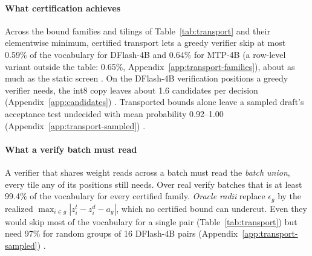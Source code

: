 \paragraph{What certification achieves} Across the bound families and tilings of Table~\ref{tab:transport} and their elementwise minimum, certified transport lets a greedy verifier skip at most 0.59\% of the vocabulary for DFlash-4B and 0.64\% for MTP-4B (a row-level variant outside the table: 0.65\%, Appendix~\ref{app:transport-families}), about as much as the static screen . On the DFlash-4B verification positions a greedy verifier needs, the int8 copy leaves about 1.6 candidates per decision (Appendix~\ref{app:candidates}) . Transported bounds alone leave a sampled draft's acceptance test undecided with mean probability 0.92--1.00 (Appendix~\ref{app:transport-sampled}) .

\paragraph{What a verify batch must read} A verifier that shares weight reads across a batch must read the \emph{batch union}, every tile any of its positions still needs. Over real verify batches that is at least 99.4\% of the vocabulary for every certified family. \emph{Oracle radii} replace $\epsilon_g$ by the realized $\max_{i\in g}|z^t_i-z^d_i-a_g|$, which no certified bound can undercut. Even they would skip most of the vocabulary for a single pair (Table~\ref{tab:transport}) but need 97\% for random groups of 16 DFlash-4B pairs (Appendix~\ref{app:transport-sampled}) .
